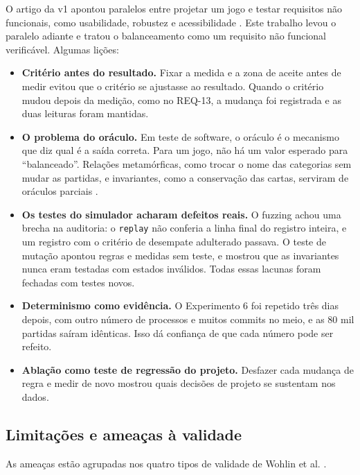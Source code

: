 O artigo da v1 apontou paralelos entre projetar um jogo e testar requisitos não funcionais, como usabilidade,
robustez e acessibilidade \cite{oliveira2025critical}. Este trabalho levou o paralelo adiante e tratou o
balanceamento como um requisito não funcional verificável. Algumas lições:
\begin{itemize}
  \item \textbf{Critério antes do resultado.} Fixar a medida e a zona de aceite antes de medir evitou que o
    critério se ajustasse ao resultado. Quando o critério mudou depois da medição, como no REQ-13, a mudança
    foi registrada e as duas leituras foram mantidas.
  \item \textbf{O problema do oráculo.} Em teste de software, o oráculo é o mecanismo que diz qual é a saída
    correta. Para um jogo, não há um valor esperado para ``balanceado''. Relações metamórficas, como trocar o nome
    das categorias sem mudar as partidas, e invariantes, como a conservação das cartas, serviram de oráculos
    parciais \cite{chen1998,segura2016}.
  \item \textbf{Os testes do simulador acharam defeitos reais.} O fuzzing achou uma brecha na auditoria: o
    \texttt{replay} não conferia a linha final do registro inteira, e um registro com o critério de desempate
    adulterado passava. O teste de mutação apontou regras e medidas sem teste, e mostrou que as invariantes nunca
    eram testadas com estados inválidos. Todas essas lacunas foram fechadas com testes novos.
  \item \textbf{Determinismo como evidência.} O Experimento 6 foi repetido três dias depois, com outro número
    de processos e muitos commits no meio, e as 80 mil partidas saíram idênticas. Isso dá confiança de que cada
    número pode ser refeito.
  \item \textbf{Ablação como teste de regressão do projeto.} Desfazer cada mudança de regra e medir de novo
    mostrou quais decisões de projeto se sustentam nos dados.
\end{itemize}

\subsection{Limitações e ameaças à validade}
\label{sec:ameacas}

As ameaças estão agrupadas nos quatro tipos de validade de Wohlin et al. \cite{wohlin2012}.


